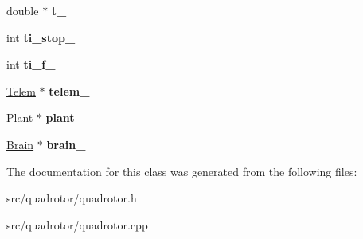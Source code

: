 \begin{DoxyCompactItemize}
\item 
\hypertarget{classQuadrotor_aedbff387d4ec89d5e7464153a24027a6}{
double $\ast$ {\bfseries t\_\-}}
\label{classQuadrotor_aedbff387d4ec89d5e7464153a24027a6}

\item 
\hypertarget{classQuadrotor_a290b8871d95f9adb6005c11540375a17}{
int {\bfseries ti\_\-stop\_\-}}
\label{classQuadrotor_a290b8871d95f9adb6005c11540375a17}

\item 
\hypertarget{classQuadrotor_a7eadaf46ba0199a2455274bf4102e68f}{
int {\bfseries ti\_\-f\_\-}}
\label{classQuadrotor_a7eadaf46ba0199a2455274bf4102e68f}

\item 
\hypertarget{classQuadrotor_a2ae40aa937f36b17d050d077cf82fa10}{
\hyperlink{classTelem}{Telem} $\ast$ {\bfseries telem\_\-}}
\label{classQuadrotor_a2ae40aa937f36b17d050d077cf82fa10}

\item 
\hypertarget{classQuadrotor_a2d994ec0dfa9b08013cce986b1fe10bd}{
\hyperlink{classPlant}{Plant} $\ast$ {\bfseries plant\_\-}}
\label{classQuadrotor_a2d994ec0dfa9b08013cce986b1fe10bd}

\item 
\hypertarget{classQuadrotor_ad1dbea34777ea6e3410a94c248ab2455}{
\hyperlink{classBrain}{Brain} $\ast$ {\bfseries brain\_\-}}
\label{classQuadrotor_ad1dbea34777ea6e3410a94c248ab2455}

\end{DoxyCompactItemize}


The documentation for this class was generated from the following files:\begin{DoxyCompactItemize}
\item 
src/quadrotor/quadrotor.h\item 
src/quadrotor/quadrotor.cpp\end{DoxyCompactItemize}

